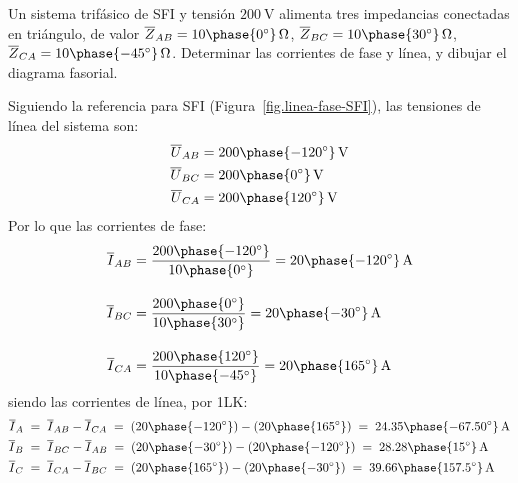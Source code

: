 	\vspace{4mm}
	\begin{example}\label{ej.3-3}
          Un sistema trifásico de SFI y tensión $\qty{200}{\volt}$
          alimenta tres impedancias conectadas en triángulo, de valor
          $\overline{Z}_{AB}=10\phase{0^\circ}\,\Omega$,
          $\overline{Z}_{BC}=10\phase{30^\circ}\,\Omega$,
          $\overline{Z}_{CA}=10\phase{-45^\circ}\,\Omega$. Determinar
          las corrientes de fase y línea, y dibujar el diagrama
          fasorial.

          \vspace{1mm} \hspace*{-5mm}\hrulefill
        
          \vspace{4mm}
	    
          Siguiendo la referencia para SFI
          (Figura~\ref{fig.linea-fase-SFI}), las tensiones de línea
          del sistema son:
          \begin{align*}
            \overline{U}_{AB}&=200\phase{-120^\circ}\,\si{\volt}\\
            \overline{U}_{BC}&=200\phase{0^\circ}\,\si{\volt}\\
            \overline{U}_{CA}&=200\phase{120^\circ}\,\si{\volt}
          \end{align*}
          Por lo que las corrientes de fase:
          \begin{align*}
            \overline{I}_{AB} &= \frac{200\phase{-120^\circ}}{10\phase{0^\circ}} =20\phase{-120^\circ}\,\si{\ampere} \\[10pt]
            \overline{I}_{BC} &= \frac{200\phase{0^\circ}}{10\phase{30^\circ}} = 20\phase{-30^\circ}\,\si{\ampere}\\[10pt]
            \overline{I}_{CA} &=\frac{200\phase{120^\circ}}{10\phase{-45^\circ}} = 20\phase{165^\circ}\,\si{\ampere}
          \end{align*}
          siendo las corrientes de línea, por 1LK:
          \begin{align*}
            \overline{I}_A \; &= \; \overline{I}_{AB} - \overline{I}_{CA} \;=\; (20\phase{-120^\circ})-(20\phase{165^\circ}) \;=\; 24.35\phase{-67.50^\circ}\,\si{\ampere}\\	        
            \overline{I}_B \; &= \; \overline{I}_{BC} - \overline{I}_{AB} \;=\; (20\phase{-30^\circ})-(20\phase{-120^\circ}) \;=\; 28.28\phase{15^\circ}\,\si{\ampere}\\
            \overline{I}_C \; &= \; \overline{I}_{CA} - \overline{I}_{BC} \;=\; (20\phase{165^\circ})-(20\phase{-30^\circ}) \;=\; 39.66\phase{157.5^\circ}\,\si{\ampere}

\end{align*}
\end{example}
